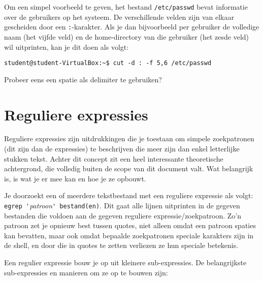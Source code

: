 \documentclass[a4paper,twoside,openany]{memoir}
\begin{document}
Om een simpel voorbeeld te geven, het bestand \verb!/etc/passwd! bevat informatie over de gebruikers op het systeem. De verschillende velden zijn van elkaar gescheiden door een \verb!:!-karakter. Als je dan bijvoorbeeld per gebruiker de volledige naam (het vijfde veld) en de home-directory van die gebruiker (het zesde veld) wil uitprinten, kan je dit doen als volgt:

\begin{verbatim}
student@student-VirtualBox:~$ cut -d : -f 5,6 /etc/passwd
\end{verbatim}

Probeer eens een spatie als delimiter te gebruiken?

\chapter{Reguliere expressies}

Reguliere expressies zijn uitdrukkingen die je toestaan om simpele zoekpatronen (dit zijn dan de expressies) te beschrijven die meer zijn dan enkel letterlijke stukken tekst. Achter dit concept zit een heel interessante theoretische achtergrond, die volledig buiten de scope van dit document valt. Wat belangrijk is, is wat je er mee kan en hoe je ze opbouwt.

Je doorzoekt een of meerdere tekstbestand met een reguliere expressie als volgt: \verb!egrep '!\emph{patroon}\verb!' bestand(en)!. Dit gaat alle lijnen uitprinten in de gegeven bestanden die voldoen aan de gegeven reguliere expressie/zoekpatroon. Zo'n patroon zet je opnieuw best tussen quotes, niet alleen omdat een patroon spaties kan bevatten, maar ook omdat bepaalde zoekpatronen speciale karakters zijn in de shell, en door die in quotes te zetten verliezen ze hun speciale betekenis.

Een regulier expressie bouw je op uit kleinere sub-expressies. De belangrijkste sub-expressies en manieren om ze op te bouwen zijn:
\end{document}
